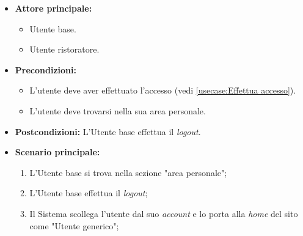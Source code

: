 \label{usecase:Logout}
\begin{itemize}
	\item \textbf{Attore principale:}
	\begin{itemize}
		\item Utente base.
		\item Utente ristoratore. 
	\end{itemize}

	\item \textbf{Precondizioni:}
	\begin{itemize}
        \item L'utente deve aver effettuato l'accesso (vedi \autoref{usecase:Effettua accesso}).
        \item L'utente deve trovarsi nella sua area personale.
    \end{itemize}

	\item \textbf{Postcondizioni:} L'Utente base effettua il \textit{logout}.

	\item \textbf{Scenario principale:}
	      \begin{enumerate}
		      \item L'Utente base si trova nella sezione "area personale";
		      \item L'Utente base effettua il \textit{logout};
              \item Il Sistema scollega l'utente dal suo \textit{account} e lo porta alla \textit{home} del sito come "Utente generico";
	      \end{enumerate}
\end{itemize}

